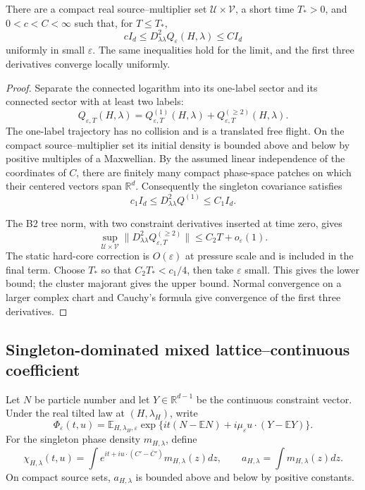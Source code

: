 \begin{lemma}
\label{lem:r3-b1-convex}
There are a compact real source--multiplier set
\(\mathcal U\times\mathcal V\), a short time \(T_*>0\), and
\(0<c<C<\infty\) such that, for \(T\le T_*\),
\[
 cI_d\le D^2_{\lambda\lambda}Q_\varepsilon(H,\lambda)
 \le CI_d
\]
uniformly in small \(\varepsilon\).  The same inequalities hold for the
limit, and the first three derivatives converge locally uniformly.
\end{lemma}

\begin{proof}
Separate the connected logarithm into its one-label sector and its connected
sector with at least two labels:
\[
 Q_{\varepsilon,T}(H,\lambda)
 =Q_{\varepsilon,T}^{(1)}(H,\lambda)
  +Q_{\varepsilon,T}^{(\ge2)}(H,\lambda).
\]
The one-label trajectory has no collision and is a translated free flight.
On the compact source--multiplier set its initial density is bounded above and
below by positive multiples of a Maxwellian.  By the assumed linear
independence of the coordinates of \(C\), there are finitely many compact
phase-space patches on which their centered vectors span \(\mathbb R^d\).
Consequently the singleton covariance satisfies
\[
 c_1I_d\le D^2_{\lambda\lambda}Q^{(1)}\le C_1I_d.
\]

The B2 tree norm, with two constraint derivatives inserted at time zero,
gives
\[
 \sup_{\mathcal U\times\mathcal V}
 \|D^2_{\lambda\lambda}Q_{\varepsilon,T}^{(\ge2)}\|
 \le C_2T+o_\varepsilon(1).
\]
The static hard-core correction is \(O(\varepsilon)\) at pressure scale and
is included in the final term.  Choose \(T_*\) so that
\(C_2T_*<c_1/4\), then take \(\varepsilon\) small.  This gives the lower
bound; the cluster majorant gives the upper bound.  Normal convergence on a
larger complex chart and Cauchy's formula give convergence of the first three
derivatives.
\end{proof}

\subsection{Singleton-dominated mixed lattice--continuous coefficient}

Let \(N\) be particle number and let \(Y\in\mathbb R^{d-1}\) be the
continuous constraint vector.  Under the real tilted law at
\((H,\lambda_H)\), write
\[
 \Phi_\varepsilon(t,u)
 =\mathbb E_{H,\lambda_H,\varepsilon}
 \exp\{it(N-\mathbb EN)+i\mu_\varepsilon u\cdot(Y-\mathbb EY)\}.
\]
For the singleton phase density \(m_{H,\lambda}\), define
\[
 \chi_{H,\lambda}(t,u)
 =\int e^{it+i u\cdot(C'-\bar C')}
 m_{H,\lambda}(z)dz,
 \qquad
 a_{H,\lambda}=\int m_{H,\lambda}(z)dz.
\]
On compact source sets, \(a_{H,\lambda}\) is bounded above and below by
positive constants.

